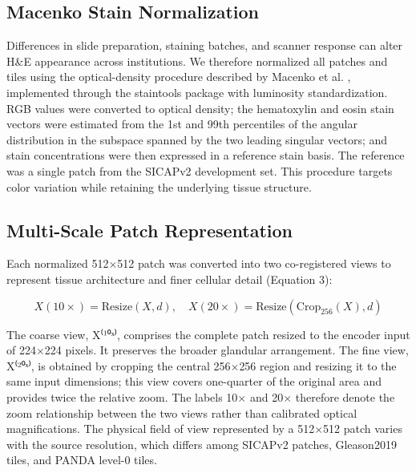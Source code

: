 \documentclass[11pt,a4paper]{article}
\begin{document}
\subsection{Macenko Stain Normalization}
Differences in slide preparation, staining batches, and scanner response can alter H\&E appearance across institutions. We therefore normalized all patches and tiles using the optical-density procedure described by Macenko et al. \cite{ref22}, implemented through the staintools package with luminosity standardization. RGB values were converted to optical density; the hematoxylin and eosin stain vectors were estimated from the 1st and 99th percentiles of the angular distribution in the subspace spanned by the two leading singular vectors; and stain concentrations were then expressed in a reference stain basis. The reference was a single patch from the SICAPv2 development set. This procedure targets color variation while retaining the underlying tissue structure.


\subsection{Multi-Scale Patch Representation}
Each normalized 512$\times$512 patch was converted into two co-registered views to represent tissue architecture and finer cellular detail (Equation 3):


\begin{equation}
X(10\times) = \text{Resize}(X, d), \quad X(20\times) = \text{Resize}(\text{Crop}_{256}(X), d)
\label{eq:multiscale}
\end{equation}

The coarse view, X⁽¹⁰ˣ⁾, comprises the complete patch resized to the encoder input of 224$\times$224 pixels. It preserves the broader glandular arrangement. The fine view, X⁽²⁰ˣ⁾, is obtained by cropping the central 256$\times$256 region and resizing it to the same input dimensions; this view covers one-quarter of the original area and provides twice the relative zoom. The labels 10$\times$ and 20$\times$ therefore denote the zoom relationship between the two views rather than calibrated optical magnifications. The physical field of view represented by a 512$\times$512 patch varies with the source resolution, which differs among SICAPv2 patches, Gleason2019 tiles, and PANDA level-0 tiles.
\end{document}
